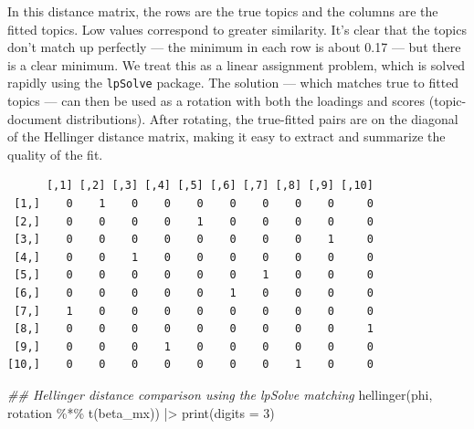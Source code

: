 \documentclass[
]{article}
\newenvironment{Shaded}{\begin{snugshade}}{\end{snugshade}}
\newcommand{\AttributeTok}[1]{\textcolor[rgb]{0.40,0.45,0.13}{#1}}
\newcommand{\DecValTok}[1]{\textcolor[rgb]{0.68,0.00,0.00}{#1}}
\newcommand{\DocumentationTok}[1]{\textcolor[rgb]{0.37,0.37,0.37}{\textit{#1}}}
\newcommand{\FunctionTok}[1]{\textcolor[rgb]{0.28,0.35,0.67}{#1}}
\newcommand{\NormalTok}[1]{\textcolor[rgb]{0.00,0.23,0.31}{#1}}
\newcommand{\OtherTok}[1]{\textcolor[rgb]{0.00,0.23,0.31}{#1}}
\newcommand{\SpecialCharTok}[1]{\textcolor[rgb]{0.37,0.37,0.37}{#1}}
\begin{document}
In this distance matrix, the rows are the true topics and the columns
are the fitted topics. Low values correspond to greater similarity. It's
clear that the topics don't match up perfectly --- the minimum in each
row is about 0.17 --- but there is a clear minimum. We treat this as a
linear assignment problem, which is solved rapidly using the
\texttt{lpSolve} package. The solution --- which matches true to fitted
topics --- can then be used as a rotation with both the loadings and
scores (topic-document distributions). After rotating, the true-fitted
pairs are on the diagonal of the Hellinger distance matrix, making it
easy to extract and summarize the quality of the fit.

\begin{Shaded}
\end{Shaded}

\begin{verbatim}
      [,1] [,2] [,3] [,4] [,5] [,6] [,7] [,8] [,9] [,10]
 [1,]    0    1    0    0    0    0    0    0    0     0
 [2,]    0    0    0    0    1    0    0    0    0     0
 [3,]    0    0    0    0    0    0    0    0    1     0
 [4,]    0    0    1    0    0    0    0    0    0     0
 [5,]    0    0    0    0    0    0    1    0    0     0
 [6,]    0    0    0    0    0    1    0    0    0     0
 [7,]    1    0    0    0    0    0    0    0    0     0
 [8,]    0    0    0    0    0    0    0    0    0     1
 [9,]    0    0    0    1    0    0    0    0    0     0
[10,]    0    0    0    0    0    0    0    1    0     0
\end{verbatim}

\begin{Shaded}
\begin{Highlighting}[]
\DocumentationTok{\#\# Hellinger distance comparison using the lpSolve matching}
\FunctionTok{hellinger}\NormalTok{(phi, rotation }\SpecialCharTok{\%*\%} \FunctionTok{t}\NormalTok{(beta\_mx)) }\SpecialCharTok{|\textgreater{}} 
    \FunctionTok{print}\NormalTok{(}\AttributeTok{digits =} \DecValTok{3}\NormalTok{)}
\end{Highlighting}
\end{Shaded}
\end{document}
